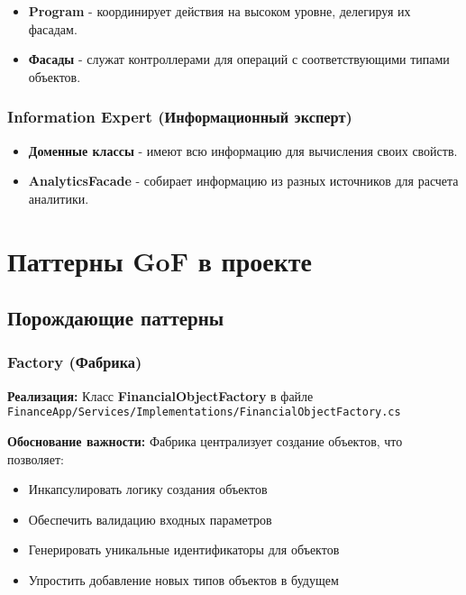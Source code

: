 \documentclass[12pt,a4paper]{article}
\begin{document}
\begin{itemize}
    \item \textbf{Program} - координирует действия на высоком уровне, делегируя их фасадам.
    \item \textbf{Фасады} - служат контроллерами для операций с соответствующими типами объектов.
\end{itemize}

\subsubsection{Information Expert (Информационный эксперт)}

\begin{itemize}
    \item \textbf{Доменные классы} - имеют всю информацию для вычисления своих свойств.
    \item \textbf{AnalyticsFacade} - собирает информацию из разных источников для расчета аналитики.
\end{itemize}

\section{Паттерны GoF в проекте}

\subsection{Порождающие паттерны}

\subsubsection{Factory (Фабрика)}

\textbf{Реализация:} Класс \textbf{FinancialObjectFactory} в файле \texttt{FinanceApp/Services/Implementations/FinancialObjectFactory.cs}

\textbf{Обоснование важности:} Фабрика централизует создание объектов, что позволяет:
\begin{itemize}
    \item Инкапсулировать логику создания объектов
    \item Обеспечить валидацию входных параметров
    \item Генерировать уникальные идентификаторы для объектов
    \item Упростить добавление новых типов объектов в будущем
\end{itemize}
    
\end{document}
